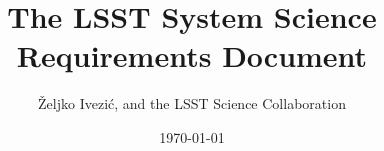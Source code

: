 \documentclass[SE,toc,lsstdraft]{lsstdoc}
\title{The LSST System Science Requirements Document}
\author{\v{Z}eljko {Ivezi{\'c}}, and the LSST Science Collaboration}
\date{\today}
\begin{document}
\maketitle













\newpage
\printglossary
\end{document}
